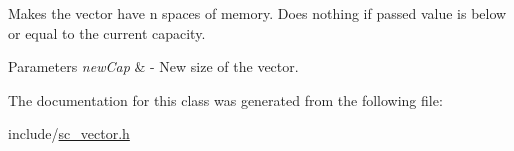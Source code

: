 Makes the vector have n spaces of memory. Does nothing if passed value is below or equal to the current capacity. 


\begin{DoxyParams}{Parameters}
{\em new\+Cap} & -\/ New size of the vector. \\
\hline
\end{DoxyParams}


The documentation for this class was generated from the following file\+:\begin{DoxyCompactItemize}
\item 
include/\hyperlink{sc__vector_8h}{sc\+\_\+vector.\+h}\end{DoxyCompactItemize}
